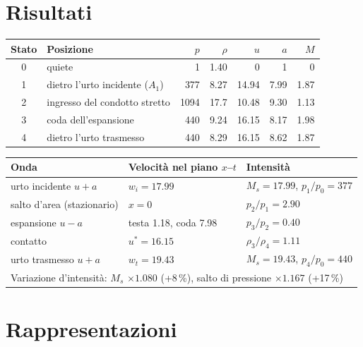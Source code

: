\documentclass[11pt,a4paper]{article}
\newcommand{\uma}{u-a}
\newcommand{\upa}{u+a}
\newcommand{\Ms}{M_{s}}
\begin{document}
\section{Risultati}
\begin{table}[H]
  \centering
  \begin{tabular}{clrrrrr}
    \toprule
    Stato & Posizione & $p$ & $\rho$ & $u$ & $a$ & $M$ \\
    \midrule
    0 & quiete & 1 & \num{1.40} & 0 & 1 & 0 \\
    1 & dietro l'urto incidente ($A_1$) & \num{377} & \num{8.27} & \num{14.94} & \num{7.99} & \num{1.87} \\
    2 & ingresso del condotto stretto & \num{1094} & \num{17.7} & \num{10.48} & \num{9.30} & \num{1.13} \\
    3 & coda dell'espansione & \num{440} & \num{9.24} & \num{16.15} & \num{8.17} & \num{1.98} \\
    4 & dietro l'urto trasmesso & \num{440} & \num{8.29} & \num{16.15} & \num{8.62} & \num{1.87} \\
    \bottomrule
  \end{tabular}
\end{table}
\begin{table}[H]
  \centering
  \begin{tabular}{lll}
    \toprule
    Onda & Velocità nel piano $x$--$t$ & Intensità \\
    \midrule
    urto incidente $\upa$ & $w_i=\num{17.99}$ & $\Ms=\num{17.99}$, $p_1/p_0=\num{377}$ \\
    salto d'area (stazionario) & $x=0$ & $p_2/p_1=\num{2.90}$ \\
    espansione $\uma$ & testa \num{1.18}, coda \num{7.98} & $p_3/p_2=\num{0.40}$ \\
    contatto & $u^*=\num{16.15}$ & $\rho_3/\rho_4=\num{1.11}$ \\
    urto trasmesso $\upa$ & $w_t=\num{19.43}$ & $\Ms=\num{19.43}$, $p_4/p_0=\num{440}$ \\
    \midrule
    \multicolumn{3}{l}{Variazione d'intensità: $\Ms$ $\times\num{1.080}$ (+8\,\%), salto di pressione $\times\num{1.167}$ (+17\,\%)} \\
    \bottomrule
  \end{tabular}
\end{table}

\section{Rappresentazioni}
\end{document}
